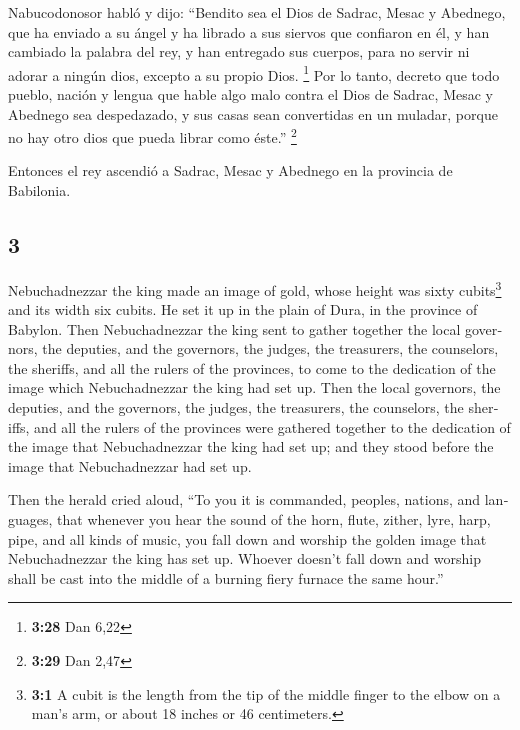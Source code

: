 \begin{paracol}{2}
 Nabucodonosor habló y dijo: ``Bendito sea el Dios de
Sadrac, Mesac y Abednego, que ha enviado a su ángel y ha librado a sus
siervos que confiaron en él, y han cambiado la palabra del rey, y han
entregado sus cuerpos, para no servir ni adorar a ningún dios, excepto a
su propio Dios. \footnote{\textbf{3:28} Dan 6,22}  Por lo
tanto, decreto que todo pueblo, nación y lengua que hable algo malo
contra el Dios de Sadrac, Mesac y Abednego sea despedazado, y sus casas
sean convertidas en un muladar, porque no hay otro dios que pueda librar
como éste.'' \footnote{\textbf{3:29} Dan 2,47}

 Entonces el rey ascendió a Sadrac, Mesac y Abednego en
la provincia de Babilonia.

\switchcolumn
\begin{otherlanguage}{english}

\hypertarget{section-5}{%
\section{3}\label{section-5}}

 Nebuchadnezzar the king made an image of gold, whose
height was sixty cubits\footnote{\textbf{3:1} A cubit is the length from
  the tip of the middle finger to the elbow on a man's arm, or about 18
  inches or 46 centimeters.} and its width six cubits. He set it up in
the plain of Dura, in the province of Babylon.  Then
Nebuchadnezzar the king sent to gather together the local governors, the
deputies, and the governors, the judges, the treasurers, the counselors,
the sheriffs, and all the rulers of the provinces, to come to the
dedication of the image which Nebuchadnezzar the king had set up.
 Then the local governors, the deputies, and the
governors, the judges, the treasurers, the counselors, the sheriffs, and
all the rulers of the provinces were gathered together to the dedication
of the image that Nebuchadnezzar the king had set up; and they stood
before the image that Nebuchadnezzar had set up.

 Then the herald cried aloud, ``To you it is commanded,
peoples, nations, and languages,  that whenever you hear
the sound of the horn, flute, zither, lyre, harp, pipe, and all kinds of
music, you fall down and worship the golden image that Nebuchadnezzar
the king has set up.  Whoever doesn't fall down and
worship shall be cast into the middle of a burning fiery furnace the
same hour.''


\end{otherlanguage}
\end{paracol}
